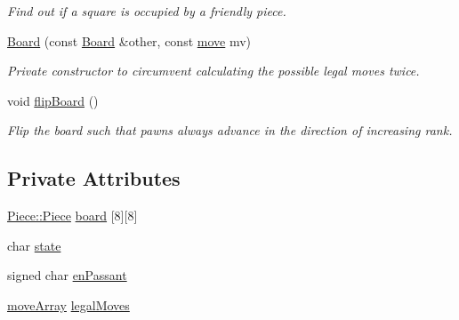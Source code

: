 \begin{DoxyCompactItemize}
\begin{DoxyCompactList}\small\item\em Find out if a square is occupied by a friendly piece. \end{DoxyCompactList}\item 
\hyperlink{classBoard_a632d2e0f09a1ad6fe835dc11ef1238cc}{Board} (const \hyperlink{classBoard}{Board} \&other, const \hyperlink{structmove}{move} mv)
\begin{DoxyCompactList}\small\item\em Private constructor to circumvent calculating the possible legal moves twice. \end{DoxyCompactList}\item 
void \hyperlink{classBoard_aeea5a9ddcdeb6e4c087f53e71f6c11ec}{flip\+Board} ()
\begin{DoxyCompactList}\small\item\em Flip the board such that pawns always advance in the direction of increasing rank. \end{DoxyCompactList}\end{DoxyCompactItemize}
\subsection*{Private Attributes}
\begin{DoxyCompactItemize}
\item 
\hyperlink{namespacePiece_a588233307aa6bdb32c1d62c9f20895cc}{Piece\+::\+Piece} \hyperlink{classBoard_acdbd7620b4c8bc08b2e42623c2a12a39}{board} \mbox{[}8\mbox{]}\mbox{[}8\mbox{]}
\item 
char \hyperlink{classBoard_a46a6e23b1b18542b10938f2b333862f1}{state}
\item 
signed char \hyperlink{classBoard_aad3145585c03f739311c35fa8f3277d3}{en\+Passant}
\item 
\hyperlink{structmoveArray}{move\+Array} \hyperlink{classBoard_aaf6a2575c3bc280ddc9e445efd213e14}{legal\+Moves}
\end{DoxyCompactItemize}


